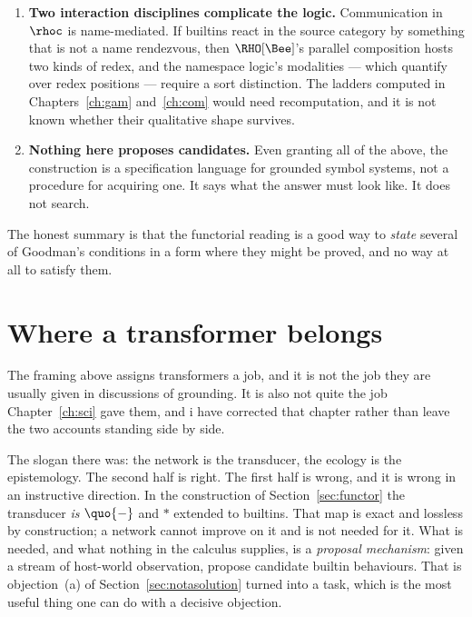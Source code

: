 \begin{enumerate}[label=\textbf{(\alph*)},leftmargin=2.4em]
\item \textbf{Two interaction disciplines complicate the logic.}
Communication in $\rhoc$ is name-mediated.
If builtins react in the source category by something that is not a
name rendezvous, then $\RHO[\Bee]$'s parallel composition hosts two
kinds of redex, and the namespace logic's modalities --- which
quantify over redex positions --- require a sort distinction.
The ladders computed in Chapters~\ref{ch:gam} and~\ref{ch:com}
would need recomputation, and it is not known whether their
qualitative shape survives.

\item \textbf{Nothing here proposes candidates.}
Even granting all of the above, the construction is a specification
language for grounded symbol systems, not a procedure for acquiring
one.
It says what the answer must look like.
It does not search.

\end{enumerate}

\noindent
The honest summary is that the functorial reading is a good way to
\emph{state} several of Goodman's conditions in a form where they
might be proved, and no way at all to satisfy them.

\section{Where a transformer belongs}
\label{sec:transformer}

The framing above assigns transformers a job, and it is not the job
they are usually given in discussions of grounding.
It is also not quite the job Chapter~\ref{ch:sci} gave them, and
i have corrected that chapter rather than leave the two accounts
standing side by side.

The slogan there was: the network is the transducer, the ecology is
the epistemology.
The second half is right.
The first half is wrong, and it is wrong in an instructive
direction.
In the construction of Section~\ref{sec:functor} the transducer
\emph{is} $\quo{-}$ and $*$ extended to builtins.
That map is exact and lossless by construction; a network cannot
improve on it and is not needed for it.
What is needed, and what nothing in the calculus supplies, is a
\emph{proposal mechanism}: given a stream of host-world
observation, propose candidate builtin behaviours.
That is objection~(a) of Section~\ref{sec:notasolution} turned into
a task, which is the most useful thing one can do with a decisive
objection.


